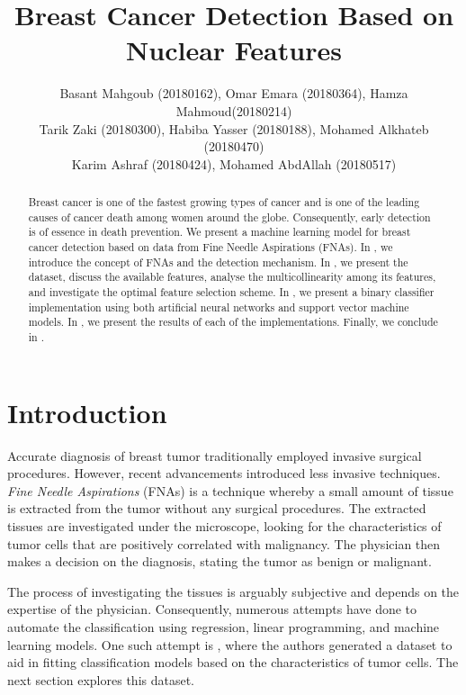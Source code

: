 \documentclass[twocolumn]{article}
\title{Breast Cancer Detection Based on Nuclear Features}
\author{
  Basant Mahgoub (20180162), Omar Emara (20180364), Hamza Mahmoud(20180214) \\
  Tarik Zaki (20180300), Habiba Yasser (20180188), Mohamed Alkhateb (20180470) \\
  Karim Ashraf (20180424), Mohamed AbdAllah (20180517)
}
\begin{document}
\maketitle

\begin{abstract}

  Breast cancer is one of the fastest growing types of cancer and is one of the
  leading causes of cancer death among women around the globe. Consequently,
  early detection is of essence in death prevention. We present a machine
  learning model for breast cancer detection based on data from Fine Needle
  Aspirations (FNAs). In , we introduce the concept of
  FNAs and the detection mechanism. In , we present the
  dataset, discuss the available features, analyse the multicollinearity among
  its features, and investigate the optimal feature selection scheme. In
  , we present a binary classifier implementation using
  both artificial neural networks and support vector machine models. In
  , we present the results of each of the implementations.
  Finally, we conclude in .

\end{abstract}

\section{Introduction}
\label{sec:Introduction}

Accurate diagnosis of breast tumor traditionally employed invasive surgical
procedures. However, recent advancements introduced less invasive techniques.
\emph{Fine Needle Aspirations} (FNAs) is a technique whereby a small amount of
tissue is extracted from the tumor without any surgical procedures. The
extracted tissues are investigated under the microscope, looking for the
characteristics of tumor cells that are positively correlated with malignancy.
The physician then makes a decision on the diagnosis, stating the tumor as
benign or malignant.

The process of investigating the tissues is arguably subjective and depends on
the expertise of the physician. Consequently, numerous attempts have done to
automate the classification using regression, linear programming, and machine
learning models. One such attempt is \autocite{Street1993}, where the authors
generated a dataset to aid in fitting classification models based on the
characteristics of tumor cells. The next section explores this dataset.
\end{document}
